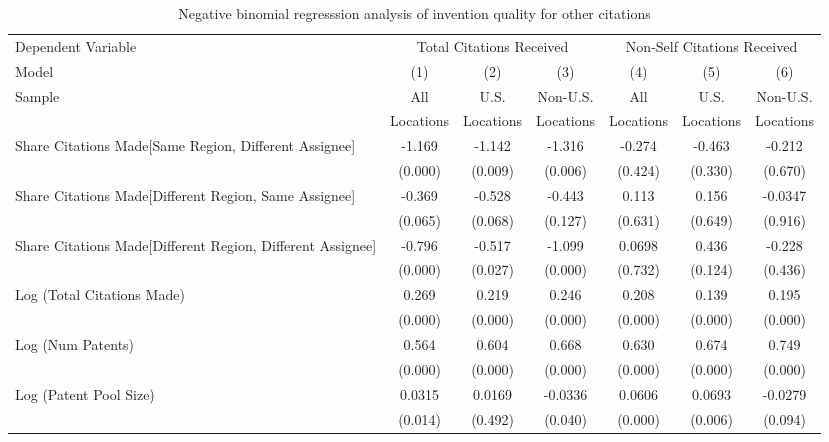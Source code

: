 \begin{sidewaystable}[htbp]\centering \caption{Negative binomial regresssion analysis of invention quality for other citations \label{o.model123192021}} \begin{tabular}{l*{6}{c}} \hline\hline
 Dependent Variable&\multicolumn{3}{c}{Total Citations Received}&\multicolumn{3}{c}{Non-Self Citations Received}\\
                Model&\multicolumn{1}{c}{(1)}&\multicolumn{1}{c}{(2)}&\multicolumn{1}{c}{(3)}&\multicolumn{1}{c}{(4)}&\multicolumn{1}{c}{(5)}&\multicolumn{1}{c}{(6)}\\
                 \hline
 \multirow{2}{*}{Sample}&\multicolumn{1}{c}{All}&\multicolumn{1}{c}{U.S.}&\multicolumn{1}{c}{Non-U.S.}&\multicolumn{1}{c}{All}&\multicolumn{1}{c}{U.S.}&\multicolumn{1}{c}{Non-U.S.}\\       
  &\multicolumn{1}{c}{Locations}&\multicolumn{1}{c}{Locations}&\multicolumn{1}{c}{Locations}&\multicolumn{1}{c}{Locations}&\multicolumn{1}{c}{Locations}&\multicolumn{1}{c}{Locations}\\ 
\hline
Share Citations Made[Same Region, Different Assignee]&   -1.169&   -1.142&   -1.316&   -0.274&   -0.463&   -0.212\\
                &  (0.000)&  (0.009)&  (0.006)&  (0.424)&  (0.330)&  (0.670)\\
Share Citations Made[Different Region, Same Assignee]&   -0.369&   -0.528&   -0.443&    0.113&    0.156&  -0.0347\\
                &  (0.065)&  (0.068)&  (0.127)&  (0.631)&  (0.649)&  (0.916)\\
Share Citations Made[Different Region, Different Assignee]&   -0.796&   -0.517&   -1.099&   0.0698&    0.436&   -0.228\\
                &  (0.000)&  (0.027)&  (0.000)&  (0.732)&  (0.124)&  (0.436)\\
Log (Total Citations Made)&    0.269&    0.219&    0.246&    0.208&    0.139&    0.195\\
                &  (0.000)&  (0.000)&  (0.000)&  (0.000)&  (0.000)&  (0.000)\\
Log (Num Patents)&    0.564&    0.604&    0.668&    0.630&    0.674&    0.749\\
                &  (0.000)&  (0.000)&  (0.000)&  (0.000)&  (0.000)&  (0.000)\\
Log (Patent Pool Size)&   0.0315&   0.0169&  -0.0336&   0.0606&   0.0693&  -0.0279\\
                &  (0.014)&  (0.492)&  (0.040)&  (0.000)&  (0.006)&  (0.094)\\

\end{tabular}
\end{sidewaystable}
